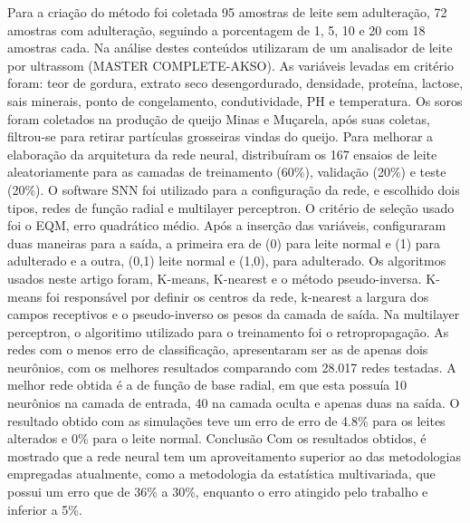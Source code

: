 \documentclass[a4paper,11pt]{article}
\begin{document}
\begin{multicols}{2}
Para a criação do método foi coletada 95 amostras de leite sem adulteração, 72 amostras com adulteração, seguindo a porcentagem de 1, 5, 10 e 20 com 18 amostras cada. Na análise destes conteúdos utilizaram de um analisador de leite por ultrassom (MASTER COMPLETE-AKSO). As variáveis levadas em critério foram: teor de gordura, extrato seco desengordurado, densidade, proteína, lactose, sais minerais, ponto de congelamento, condutividade, PH e temperatura.
Os soros foram coletados na produção de queijo Minas e Muçarela, após suas coletas, filtrou-se para retirar partículas grosseiras vindas do queijo.
Para melhorar a elaboração da arquitetura da rede neural, distribuíram os 167 ensaios de leite aleatoriamente para as camadas de treinamento (60\%), validação (20\%) e teste (20\%).
O software SNN foi utilizado para a configuração da rede, e escolhido dois tipos, redes de função radial e multilayer perceptron. O critério de seleção usado foi o EQM, erro quadrático médio.
Após a inserção das variáveis, configuraram duas maneiras para a saída, a primeira era de (0) para leite normal e (1) para adulterado e a outra, (0,1) leite normal e (1,0), para adulterado.
Os algoritmos usados neste artigo foram, K-means, K-nearest e o método pseudo-inversa. K-means foi responsável por definir os centros da rede, k-nearest a largura dos campos receptivos e o pseudo-inverso os pesos da camada de saída. Na multilayer perceptron, o algoritimo utilizado para o treinamento foi o retropropagação.
As redes com o menos erro de classificação, apresentaram ser as de apenas dois neurônios, com os melhores resultados comparando com 28.017 redes testadas.
A melhor rede obtida é a de função de base radial, em que esta possuía 10 neurônios na camada de entrada, 40 na camada oculta e apenas duas na saída. O resultado obtido com as simulações teve um erro de erro de 4.8\% para os leites alterados e 0\% para o leite normal.
Conclusão
Com os resultados obtidos, é mostrado que a rede neural tem um aproveitamento superior ao das metodologias empregadas atualmente, como a metodologia da estatística multivariada, que possui um erro que de 36\% a 30\%, enquanto o erro atingido pelo trabalho e inferior a 5\%.





\end{multicols}
\end{document}
